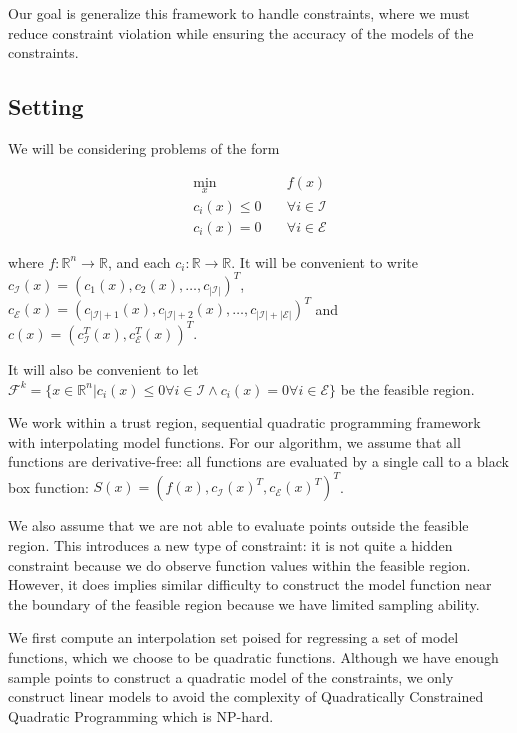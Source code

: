 \documentclass{article}
\begin{document}
Our goal is generalize this framework to handle constraints, where we must reduce constraint violation while ensuring the accuracy of the models of the constraints.


\subsection{Setting}

We will be considering problems of the form


\begin{center}
\begin{align}
\label{problem}
\min_x & \quad f(x) \\
  c_i(x) \le 0   & \quad \forall i \in \mathcal {I} \nonumber \\
  c_i(x)  = 0    & \quad \forall i \in \mathcal {E} \nonumber
\end{align}
\end{center}
where $f : \mathbb R^n \to \mathbb R$, and each $c_i : \mathbb{R} \to \mathbb{R}$.
It will be convenient to write
$c_{\mathcal {I}}(x) = (c_1(x), c_2(x), \ldots, c_{|\mathcal{I}|})^T$,
$c_{\mathcal {E}}(x) = (c_{|\mathcal{I}|+1}(x), c_{|\mathcal{I}|+2}(x), \ldots, c_{|\mathcal{I}| + |\mathcal{E}|})^T$ and
$c(x) = (c_{\mathcal{I}}^T(x), c_{\mathcal{E}}^T(x))^T$.

It will also be convenient to let $\mathcal{F}^k = \{ x \in \mathbb R^n | c_i(x) \le 0 \forall i \in \mathcal{I} \wedge c_i(x) = 0 \forall i \in \mathcal{E}\}$ be the feasible region.

We work within a trust region, sequential quadratic programming framework with interpolating model functions.
For our algorithm, we assume that all functions are derivative-free: all functions are evaluated by a single call to a black box function:
$S(x) = (f(x), c_{\mathcal {I}}(x)^T, c_{\mathcal {E}}(x)^T)^T$.

\color{blue}
We also assume that we are not able to evaluate points outside the feasible region.
This introduces a new type of constraint: it is not quite a hidden constraint because we do observe function values within the feasible region.
However, it does implies similar difficulty to construct the model function near the boundary of the feasible region because we have limited sampling ability.
\color{black}

We first compute an interpolation set poised for regressing a set of model functions, which we choose to be quadratic functions.
Although we have enough sample points to construct a quadratic model of the constraints, we only construct linear models to avoid the complexity of Quadratically Constrained Quadratic Programming which is NP-hard.
\end{document}
